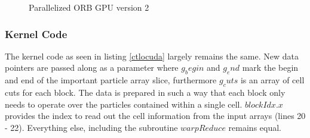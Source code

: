\documentclass[]{article}
\begin{document}
\begin{figure}[H]
	\begin{center}
	\end{center}
	\caption{Parallelized ORB GPU version 2}
	\label{fig:orbgpup2}
\end{figure}


\subsubsection{Kernel Code}

The kernel code as seen in listing \ref{ctlocuda} largely remains the same. New data pointers are passed along as a parameter where $g_begin$ and $g_end$ mark the begin and end of the important particle array slice, furthermore $g_cuts$ is an array of cell cuts for each block. The data is prepared in such a way that each block only needs to operate over the particles contained within a single cell. $blockIdx.x$ provides the index to read out the cell information from the input arrays (lines 20 - 22). Everything else, including the subroutine $warpReduce$ remains equal. 
\end{document}
